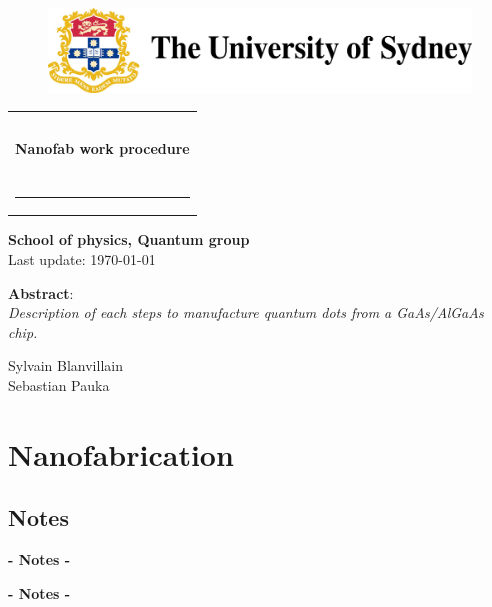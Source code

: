 \documentclass[12pt,a4paper]{report}
\begin{document}
\thispagestyle{empty}

\begin{figure}[tl]
\includegraphics[scale=0.4]{fig/usydlogo.jpg}
\end{figure}

\begin{tabular}{c}
\\
\\
\\
\begin{huge}
\textbf{Nanofab work procedure}
\end{huge}
\\
\\
\rule{14cm}{1mm}
\end{tabular}

\vspace{2cm}

\begin{flushright}

\begin{Large}
\textbf{School of physics, Quantum group}\\
\vspace{0.5cm}
Last update: \today
\end{Large}
\end{flushright}

\vspace{4cm}

\noindent \textbf{Abstract}:\\
\textit{Description of each steps to manufacture quantum dots from a GaAs/AlGaAs chip.}\\

\begin{flushright}
Sylvain Blanvillain\\
Sebastian Pauka
\end{flushright}

\newpage

\chapter{Nanofabrication}














\section{Notes}

\newpage

\textbf{- Notes -}

\newpage

\textbf{- Notes -}
\end{document}
